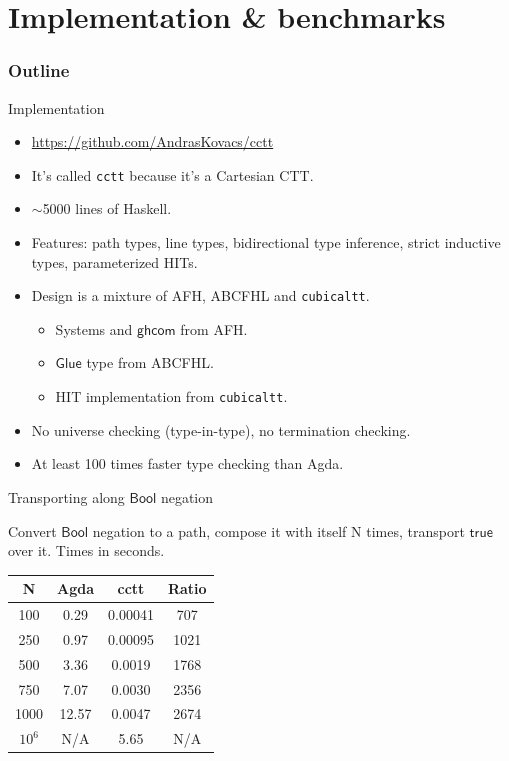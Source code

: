 \documentclass[dvipsnames]{beamer}
\newcommand{\ms}[1]{\mathsf{#1}}
\newcommand{\Bool}{\ms{Bool}}
\newcommand{\true}{\ms{true}}
\newcommand{\Glue}{\ms{Glue}}
\newcommand{\ghcom}{\ms{ghcom}}
\begin{document}
\section{Implementation \& benchmarks}
\begin{frame}
  \frametitle{Outline}
  \tableofcontents[currentsection]
\end{frame}

\begin{frame}{Implementation}

\begin{itemize}
\item \url{https://github.com/AndrasKovacs/cctt}
\item It's called \texttt{cctt} because it's a Cartesian CTT.
\item $\sim$5000 lines of Haskell.
\item Features: path types, line types, bidirectional type inference, strict
      inductive types, parameterized HITs.
\item Design is a mixture of AFH, ABCFHL and \texttt{cubicaltt}.
  \begin{itemize}
    \item Systems and $\ghcom$ from AFH.
    \item $\Glue$ type from ABCFHL.
    \item HIT implementation from \texttt{cubicaltt}.
  \end{itemize}
\item No universe checking (type-in-type), no termination checking.
\item At least 100 times faster type checking than Agda.
\end{itemize}

\end{frame}


\begin{frame}{Transporting along $\ms{Bool}$ negation}

Convert $\Bool$ negation to a path, compose it with itself N times, transport
$\true$ over it. Times in seconds.
\vspace{1em}

\begin{center}
\begin{tabular}{|c||c|c|c|}
\hline
  \textbf{N} & \textbf{Agda} & \textbf{cctt} & \textbf{Ratio} \\
\hline
\hline
  100 & 0.29 & 0.00041 & 707 \\
\hline
  250 & 0.97 & 0.00095 & 1021 \\
\hline
  500 & 3.36 & 0.0019 & 1768 \\
\hline
  750 & 7.07 & 0.0030 & 2356 \\
\hline
  1000 & 12.57 & 0.0047 & 2674 \\
\hline
  $10^6$ & N/A & 5.65 & N/A \\
\hline
\end{tabular}
\end{center}


\end{frame}
\end{document}
